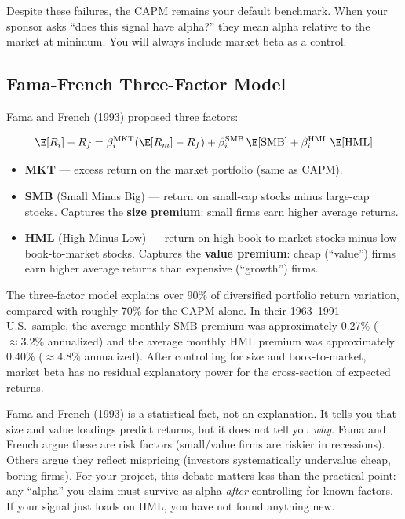 Despite these failures, the CAPM remains your default benchmark. When your sponsor asks ``does this signal have alpha?'' they mean alpha relative to the market at minimum. You will always include market beta as a control.

\subsection{Fama-French Three-Factor Model}

Fama and French (1993) proposed three factors:

\begin{equation}
\E[R_i] - R_f = \beta_i^{\text{MKT}}(\E[R_m] - R_f) + \beta_i^{\text{SMB}} \, \E[\text{SMB}] + \beta_i^{\text{HML}} \, \E[\text{HML}]
\label{eq:ff3}
\end{equation}
\begin{itemize}[nosep]
  \item \textbf{MKT} --- excess return on the market portfolio (same as CAPM).
  \item \textbf{SMB} (Small Minus Big) --- return on small-cap stocks minus large-cap stocks. Captures the \textbf{size premium}: small firms earn higher average returns.
  \item \textbf{HML} (High Minus Low) --- return on high book-to-market stocks minus low book-to-market stocks. Captures the \textbf{value premium}: cheap (``value'') firms earn higher average returns than expensive (``growth'') firms.
\end{itemize}

\begin{keyresult}
The three-factor model explains over 90\% of diversified portfolio return variation, compared with roughly 70\% for the CAPM alone. In their 1963--1991 U.S.\ sample, the average monthly SMB premium was approximately 0.27\% (${}\approx 3.2\%$ annualized) and the average monthly HML premium was approximately 0.40\% (${}\approx 4.8\%$ annualized). After controlling for size and book-to-market, market beta has no residual explanatory power for the cross-section of expected returns.
\end{keyresult}

\begin{warning}
Fama and French (1993) is a statistical fact, not an explanation. It tells you that size and value loadings predict returns, but it does not tell you \emph{why}. Fama and French argue these are risk factors (small/value firms are riskier in recessions). Others argue they reflect mispricing (investors systematically undervalue cheap, boring firms). For your project, this debate matters less than the practical point: any ``alpha'' you claim must survive as alpha \emph{after} controlling for known factors. If your signal just loads on HML, you have not found anything new.
\end{warning}

